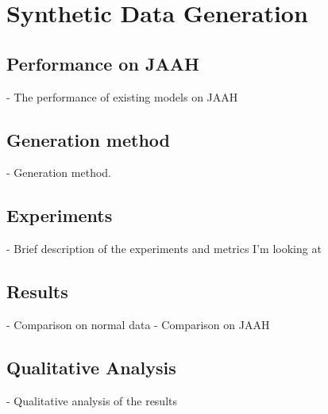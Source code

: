 \chapter{Synthetic Data Generation}
\label{chap:synthetic_data}


\section{Performance on JAAH}
- The performance of existing models on JAAH

\section{Generation method} 
- Generation method. 

\section{Experiments}
- Brief description of the experiments and metrics I'm looking at

\section{Results}
- Comparison on normal data
- Comparison on JAAH

\section{Qualitative Analysis}
- Qualitative analysis of the results